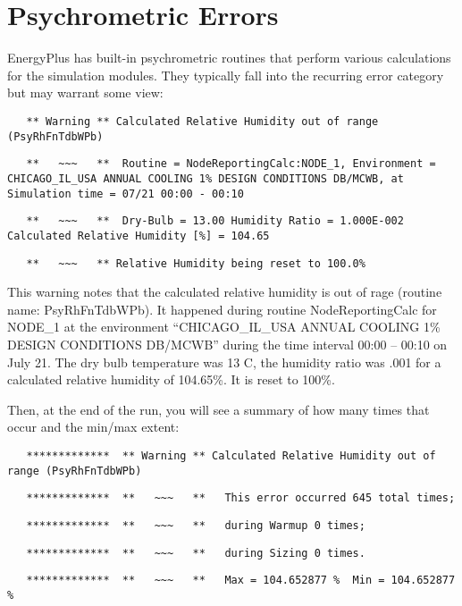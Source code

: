 \section{Psychrometric Errors}\label{psychrometric-errors}

EnergyPlus has built-in psychrometric routines that perform various calculations for the simulation modules. They typically fall into the recurring error category but may warrant some view:

\begin{lstlisting}
   ** Warning ** Calculated Relative Humidity out of range (PsyRhFnTdbWPb)
\end{lstlisting}

\begin{lstlisting}
   **   ~~~   **  Routine = NodeReportingCalc:NODE_1, Environment = CHICAGO_IL_USA ANNUAL COOLING 1% DESIGN CONDITIONS DB/MCWB, at Simulation time = 07/21 00:00 - 00:10
\end{lstlisting}

\begin{lstlisting}
   **   ~~~   **  Dry-Bulb = 13.00 Humidity Ratio = 1.000E-002 Calculated Relative Humidity [%] = 104.65
\end{lstlisting}

\begin{lstlisting}
   **   ~~~   ** Relative Humidity being reset to 100.0%
\end{lstlisting}

This warning notes that the calculated relative humidity is out of rage (routine name: PsyRhFnTdbWPb). It happened during routine NodeReportingCalc for NODE\_1 at the environment ``CHICAGO\_IL\_USA ANNUAL COOLING 1\% DESIGN CONDITIONS DB/MCWB'' during the time interval 00:00 -- 00:10 on July 21. The dry bulb temperature was 13 C, the humidity ratio was .001 for a calculated relative humidity of 104.65\%. It is reset to 100\%.

Then, at the end of the run, you will see a summary of how many times that occur and the min/max extent:

\begin{lstlisting}
   *************  ** Warning ** Calculated Relative Humidity out of range (PsyRhFnTdbWPb)
\end{lstlisting}

\begin{lstlisting}
   *************  **   ~~~   **   This error occurred 645 total times;
\end{lstlisting}

\begin{lstlisting}
   *************  **   ~~~   **   during Warmup 0 times;
\end{lstlisting}

\begin{lstlisting}
   *************  **   ~~~   **   during Sizing 0 times.
\end{lstlisting}

\begin{lstlisting}
   *************  **   ~~~   **   Max = 104.652877 %  Min = 104.652877 %
\end{lstlisting}
